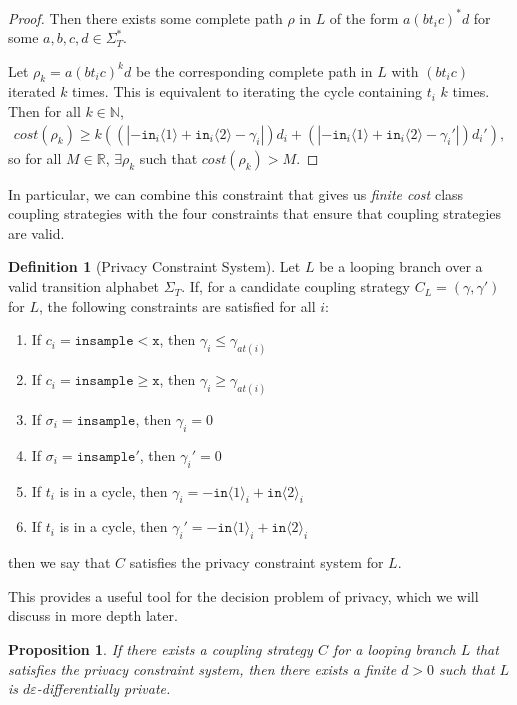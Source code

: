 \documentclass[12pt]{article}
\newcommand{\NN}{\mathbb{N}}
\newcommand{\RR}{\mathbb{R}}
\newcommand{\gguard}[1][x]{\texttt{insample}\geq #1}
\newcommand{\lguard}[1][x]{\texttt{insample} < #1}
\newcommand{\brangle}[1]{\langle #1 \rangle}
\newtheorem{prop}[thm]{Proposition}
\theoremstyle{definition}
\newtheorem{defn}[thm]{Definition}
\begin{document}
\begin{proof}
    Then there exists some complete path $\rho$ in $L$ of the form $a(bt_ic)^*d$ for some $a, b, c, d\in \Sigma_T^*$.
    
    Let $\rho_k=a(bt_ic)^kd$ be the corresponding complete path in $L$ with $(bt_ic)$ iterated $k$ times. This is equivalent to iterating the cycle containing $t_i$ $k$ times. Then for all $k\in \NN$, \begin{align*}
        cost(\rho_k) \geq k((|-\texttt{in}_i\brangle{1}+\texttt{in}_i\brangle{2}-\gamma_i|)d_i+(|-\texttt{in}_i\brangle{1}+\texttt{in}_i\brangle{2}-\gamma_i'|)d_i'),
    \end{align*}
    so for all $M\in \RR$, $\exists \rho_k$ such that $cost(\rho_k) > M$.
\end{proof}

In particular, we can combine this constraint that gives us \textit{finite cost} class coupling strategies with the four constraints that ensure that coupling strategies are valid. 

\begin{defn}[Privacy Constraint System]
    Let $L$ be a looping branch over a valid transition alphabet $\Sigma_T$. If, for a candidate coupling strategy $C_L = (\gamma, \gamma')$ for $L$, the following constraints are satisfied for all $i$: \begin{enumerate}
        \item If $c_i = \lguard[\texttt{x}]$, then $\gamma_i\leq\gamma_{at(i)}$
        \item If $c_i = \gguard[\texttt{x}]$, then $\gamma_i\geq\gamma_{at(i)}$
        \item If $\sigma_i = \texttt{insample}$, then $\gamma_i=0$
        \item If $\sigma_i = \texttt{insample}'$, then $\gamma_i'=0$
        \item If $t_i$ is in a cycle, then $\gamma_i = -\texttt{in}\brangle{1}_i+\texttt{in}\brangle{2}_i$
        \item If $t_i$ is in a cycle, then $\gamma_i' = -\texttt{in}\brangle{1}_i+\texttt{in}\brangle{2}_i$
    \end{enumerate}
    then we say that $C$ satisfies the privacy constraint system for $L$. 
\end{defn}

This provides a useful tool for the decision problem of privacy, which we will discuss in more depth later. 

\begin{prop}\label{privacyFiniteCostProp}
    If there exists a coupling strategy $C$ for a looping branch $L$ that satisfies the privacy constraint system, then there exists a finite $d>0$ such that $L$ is $d\varepsilon$-differentially private. 
\end{prop}
\end{document}
